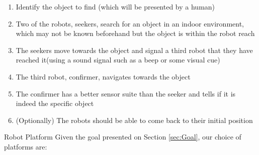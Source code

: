 \documentclass[conference]{IEEEtran}
\makeatletter
\renewcommand\section{\@startsection{section}{1}{\z@}
                                  {-3.0ex plus -1.5ex minus -0.5ex}
                                  {0.7ex plus 1ex minus 0ex}
                                  {\bfseries}}
\makeatother
\begin{document}
\begin{enumerate}
\item{ Identify the object to find (which will be presented by a human) }
\item{Two of the robots, seekers, search for an object in an indoor environment, which may
not be known beforehand but the object is within the robot reach }
\item{ The seekers move towards the object and signal a third robot that they have reached it(using
a sound signal such as a beep or some visual cue) }
\item{The third robot, confirmer, navigates towards the object}
\item{The confirmer has a better sensor suite than the seeker and tells if it is indeed the specific object}
\item{(Optionally) The robots should be able to come back to their 
initial position}
\end{enumerate}

\section{Robot Platform}
Given the goal presented on Section \ref{sec:Goal}, 
our choice of platforms are: 
\end{document}
